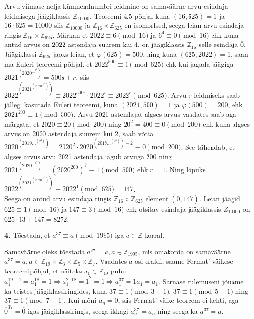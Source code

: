 \documentclass[a4paper, 10pt]{article}
\newcommand{\Z}{\mathbb{Z}}
\newcommand{\w}{\overline}
\begin{document}
\bigskip
Arvu viimase nelja kümnendnumbri leidmine on samaväärne arvu esindaja leidmisega jäägiklassis $\Z_{10000}$. Teoreemi 4.5 põhjal kuna $(16,625)=1$ ja $16\cdot625=10000$ siis $\Z_{10000}$ ja $\Z_{16}\times \Z_{625}$ on isomorfsed, seega leian arvu esindaja ringis $\Z_{16}\times \Z_{625}$. Märkan et $2022\equiv6\pmod{16}$ ja $6^4\equiv0\pmod{16}$ ehk kuna antud arvus on 2022 astendaja suurem kui 4, on jäägiklassis $\Z_{16}$ selle esindaja $\w0$.\\
Jäägiklassi $\Z_{625}$ jaoks leian, et $\varphi(625)=500$, ning kuna $(625,2022)=1$, saan ma Euleri teoreemi põhjal, et $2022^{500}\equiv1\pmod{625}$ ehk kui jagada jäägiga $2021^{(2020^{\ldots^{2^1}})}= 500q+r$, siis $2022^{(2021^{(2020^{\ldots^{2^1}})})}\equiv2022^{500q}\cdot2022^r\equiv2022^r\pmod{625}$. Arvu $r$ leidmiseks saab jällegi kasutada Euleri teoreemi, kuna $(2021,500)=1$ ja $\varphi(500)=200$, ehk $2021^{200}\equiv1\pmod{500}$. Arvu 2021 astendajat algses arvus vaadates saab aga märgata, et $2020\equiv20\pmod {200}$ ning $20^2=400\equiv0\pmod{200}$ ehk kuna algses arvus on 2020 astendaja suurem kui 2, saab võtta $2020^{(2019\dots^{(2^1)})}=2020^2\cdot2020^{(2019\dots^{(2^1)})-2}\equiv0\pmod{200}$. See tähendab, et algses arvus arvu 2021 astendaja jagub arvuga 200 ning $2021^{(2020^{\ldots^{2^1}})}=(2020^200)^k\equiv1\pmod{500}$ ehk $r=1$. Ning lõpuks $2022^{(2021^{(2020^{\ldots^{2^1}})})}\equiv2022^1\pmod {625}=147$.\\
Seega on antud arvu esindaja ringis $\Z_{16}\times\Z_{625}$ element $(\w0,\w{147})$. Leian jäägid $625\equiv1\pmod{16}$ ja $147\equiv3\pmod{16}$ ehk otsitav esindaja jäägiklassis $Z_{10000}$ on $625\cdot13+147=8272$.
\bigskip

\noindent \textbf{4.} Tõestada, et \mbox{$a^{37}\equiv a\pmod{1995}$} iga $a\in\Z$ korral.  

\bigskip
Samaväärne oleks tõestada $a^{37}=a, a\in\Z_{1995}$, mis omakorda on samaväärne $a^{37}=a, a\in\Z_{19}\times\Z_3\times\Z_5\times\Z_7$. Vaadates $a$ osi eraldi, saame Fermat' väikese teoreemipõhjal, et näiteks $a_1\in\Z_{19}$ puhul $a_1^{19-1}=a_1^{18}=\overline{1}\Rightarrow a_1^{2\cdot18}=\overline{1}^2=\overline{1}\Rightarrow a_1^{37}=\overline{1}a_1=a_1$. Sarnase tulemuseni jõuame ka teistes jäägi\-klassi\-ringides, kuna $37\equiv 1 \pmod{3-1}$, $37\equiv 1 \pmod{5-1}$ ning $37\equiv 1 \pmod{7-1}$. Kui mõni $a_n=0$, siis Fermat' väike teoreem ei kehti, aga $\overline{0}^{37}=\overline{0}$ igas jäägiklassiringis, seega ikkagi $a_n^{37}=a_n$ ning seega ka $a^{37}=a$.
\bigskip
\end{document}
